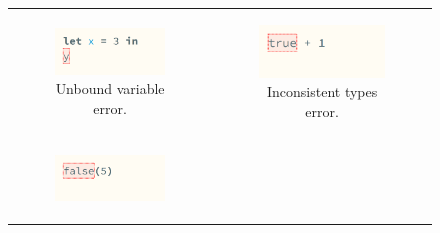 \begin{figure}[htbp]
  \begin{tabular}[b]{cc}
    \begin{subfigure}[b]{0.3\columnwidth}
      \includegraphics[width=\columnwidth]{images/haz3l-unbound-variable.png}
      \caption{Unbound variable error.}
      \label{fig:calculus-examples-unbound}
    \end{subfigure}
    &
    \begin{subfigure}[b]{0.3\columnwidth}
      \includegraphics[width=\columnwidth]{images/haz3l-inconsistent-types.png}
      \caption{Inconsistent types error.}
      \label{fig:calculus-examples-inconsistent-types}
    \end{subfigure} \\
    \begin{subfigure}[b]{0.3\columnwidth}
      \includegraphics[width=\columnwidth]{images/haz3l-ap-non-matched.png}

\end{subfigure}
\end{tabular}
\end{figure}
